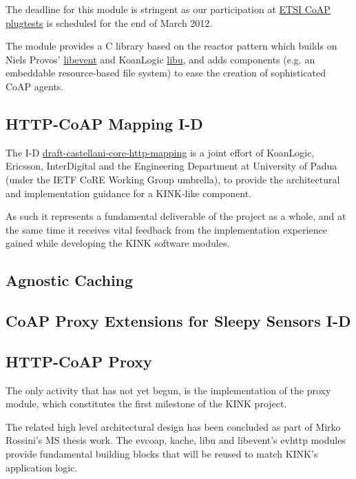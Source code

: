 \documentclass[12pt]{article}
\begin{document}
The deadline for this module is stringent as our participation at \href{http://www.etsi.org/plugtests/coap/coap.htm}{ETSI CoAP plugtests} is scheduled for the end of March 2012.

The module provides a C library based on the reactor pattern which builds on Niels Provos' \href{http://libevent.org}{libevent} and KoanLogic \href{http://koanlogic.com/libu}{libu}, and adds components (e.g. an embeddable resource-based file system) to ease the creation of sophisticated CoAP agents.

\subsection{HTTP-CoAP Mapping I-D}
The I-D \href{http://tools.ietf.org/html/draft-castellani-core-http-mapping}{draft-castellani-core-http-mapping} is a joint effort of \mbox{KoanLogic}, \mbox{Ericsson}, \mbox{InterDigital} and the Engineering Department at University of Padua (under the IETF CoRE Working Group umbrella), to provide the architectural and implementation guidance for a KINK-like component.

As such it represents a fundamental deliverable of the project as a whole, and at the same time it receives vital feedback from the implementation experience gained while developing the KINK software modules.

\subsection{Agnostic Caching}


\subsection{CoAP Proxy Extensions for Sleepy Sensors I-D}


\subsection{HTTP-CoAP Proxy}
The only activity that has not yet begun, is the implementation of the proxy module, which constitutes the first milestone of the KINK project. 

The related high level architectural design has been concluded as part of Mirko Rossini's MS thesis work.  The evcoap, kache, libu and libevent's evhttp modules provide fundamental building blocks that will be reused to match KINK's application logic.
\end{document}
